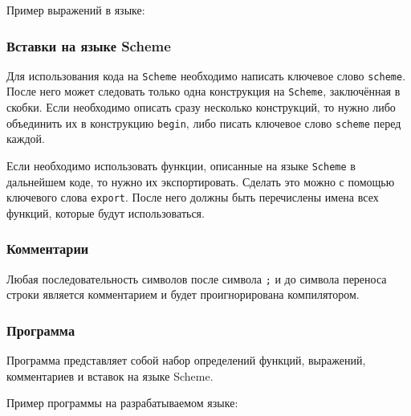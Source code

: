             

            Пример выражений в языке:
            

        \subsubsection{Вставки на языке Scheme}
            Для использования кода на \verb$Scheme$ необходимо написать ключевое слово \verb$scheme$.
            После него может следовать только одна конструкция на \verb$Scheme$, заключённая в скобки.
            Если необходимо описать сразу несколько конструкций, то нужно либо объединить их в конструкцию \verb$begin$, либо писать ключевое слово \verb$scheme$ перед каждой.
            
            

            Если необходимо использовать функции, описанные на языке \verb$Scheme$ в дальнейшем коде, то нужно их экспортировать.
            Сделать это можно с помощью ключевого слова \verb$export$.
            После него должны быть перечислены имена всех функций, которые будут использоваться.
            
            

        \subsubsection{Комментарии}
            Любая последовательность символов после символа \verb$;$ и до символа переноса строки является комментарием и будет проигнорирована компилятором.

            

        \subsubsection{Программа}
            \label{syntax:program}
            Программа представляет собой набор определений функций, выражений, комментариев и вставок на языке Scheme.

            

            Пример программы на разрабатываемом языке:

            
